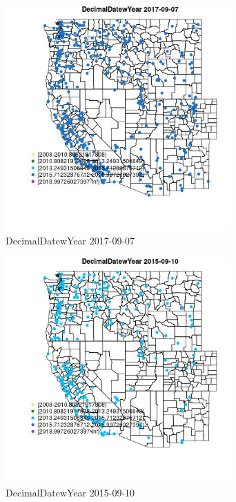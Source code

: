 \begin{figure} 
\centering  
\includegraphics[width=0.77\textwidth]{Code_Outputs/Report_ML_input_PM25_Step4_part_e_de_duplicated_aveswNAs_MapObsDecimalDatewYear2017-09-07.jpg} 
\caption{\label{fig:Report_ML_input_PM25_Step4_part_e_de_duplicated_aveswNAsMapObsDecimalDatewYear2017-09-07}DecimalDatewYear 2017-09-07} 
\end{figure} 
 

\begin{figure} 
\centering  
\includegraphics[width=0.77\textwidth]{Code_Outputs/Report_ML_input_PM25_Step4_part_e_de_duplicated_aveswNAs_MapObsDecimalDatewYear2015-09-10.jpg} 
\caption{\label{fig:Report_ML_input_PM25_Step4_part_e_de_duplicated_aveswNAsMapObsDecimalDatewYear2015-09-10}DecimalDatewYear 2015-09-10} 
\end{figure} 
 

